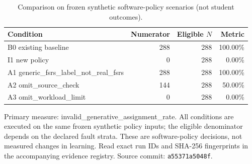 \begin{table}[htbp]
\centering
\small
\caption{Comparison on frozen synthetic software-policy scenarios (not student outcomes).}
\label{tab:ln-03-policy-benchmark}
\begin{tabular}{lrrr}
\toprule
Condition & Numerator & Eligible $N$ & Metric \\
\midrule
B0 existing baseline & 288 & 288 & 100.00\% \\
I1 new policy & 0 & 288 & 0.00\% \\
A1 generic\_fsrs\_label\_not\_real\_fsrs & 288 & 288 & 100.00\% \\
A2 omit\_source\_check & 144 & 288 & 50.00\% \\
A3 omit\_workload\_limit & 0 & 288 & 0.00\% \\
\bottomrule
\end{tabular}
\par\smallskip
\begin{minipage}{0.98\linewidth}\footnotesize
Primary measure: invalid\_generative\_assignment\_rate. All conditions are executed on the same frozen synthetic policy inputs; the eligible denominator depends on the declared fault strata. These are software-policy decisions, not measured changes in learning. Read exact run IDs and SHA-256 fingerprints in the accompanying evidence registry. Source commit: \texttt{a55371a5048f}.
\end{minipage}
\end{table}
